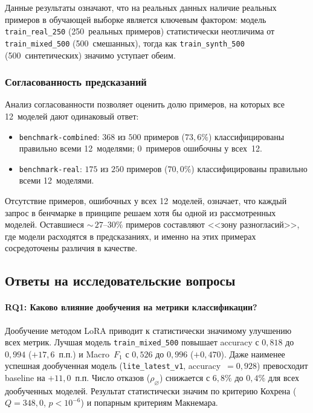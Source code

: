 Данные результаты означают, что на реальных данных наличие реальных примеров в обучающей выборке является ключевым фактором: модель \texttt{train\_real\_250} (250~реальных примеров) статистически неотличима от \texttt{train\_mixed\_500} (500~смешанных), тогда как \texttt{train\_synth\_500} (500~синтетических) значимо уступает обеим.

\subsubsection{Согласованность предсказаний}

Анализ согласованности позволяет оценить долю примеров, на которых все 12~моделей дают одинаковый ответ:
\begin{itemize}
    \item \texttt{benchmark-combined}: $368$ из $500$ примеров ($73{,}6\%$) классифицированы правильно всеми 12~моделями; $0$~примеров ошибочны у всех~12.
    \item \texttt{benchmark-real}: $175$ из $250$ примеров ($70{,}0\%$) классифицированы правильно всеми 12~моделями.
\end{itemize}

Отсутствие примеров, ошибочных у всех 12~моделей, означает, что каждый запрос в бенчмарке в принципе решаем хотя бы одной из рассмотренных моделей. Оставшиеся ${\sim}\,27\text{--}30\%$ примеров составляют <<зону разногласий>>, где модели расходятся в предсказаниях, и именно на этих примерах сосредоточены различия в качестве.

\subsection{Ответы на исследовательские вопросы} \label{subsec:rq_answers}

\paragraph{\textsc{RQ1}: Каково влияние дообучения на метрики классификации?}

Дообучение методом LoRA приводит к статистически значимому улучшению всех метрик. Лучшая модель \texttt{train\_mixed\_500} повышает accuracy с $0{,}818$ до $0{,}994$ ($+17{,}6$~п.п.) и Macro~$F_1$ с $0{,}526$ до $0{,}996$ ($+0{,}470$). Даже наименее успешная дообученная модель (\texttt{lite\_latest\_v1}, accuracy~$= 0{,}928$) превосходит baseline на $+11{,}0$~п.п. Число отказов ($\rho_\varnothing$) снижается с $6{,}8\%$ до $0{,}4\%$ для всех дообученных моделей. Результат статистически значим по критерию Кохрена ($Q = 348{,}0$, $p < 10^{-6}$) и попарным критериям Макнемара.

